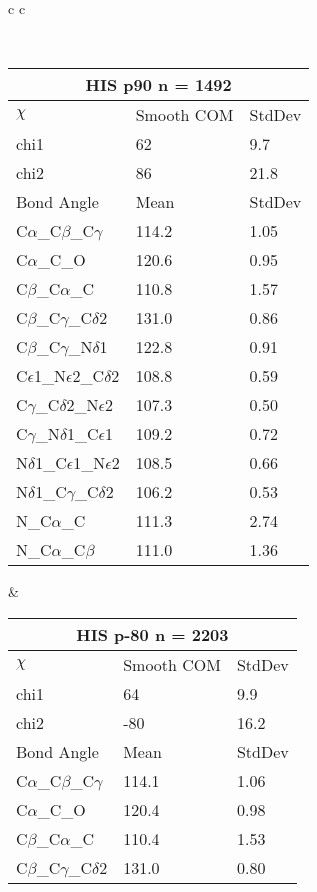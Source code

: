 \newpage

\begin{longtable}{ c c }

\caption{HIS Central Values}\\
  \begin{tabular}{ l l l }
  \toprule
  \multicolumn{3}{c}{HIS \textbf{p90} n = 1492} \\ \toprule
  $\chi$       & Smooth COM & StdDev \\ \midrule
  chi1 & 62 & 9.7 \\ 
  chi2 & 86 & 21.8 \\ \midrule
  Bond Angle   & Mean     & StdDev \\ \midrule
  C$\alpha$\_C$\beta$\_C$\gamma$ & 114.2 & 1.05\\
  C$\alpha$\_C\_O & 120.6 & 0.95\\
  C$\beta$\_C$\alpha$\_C & 110.8 & 1.57\\
  C$\beta$\_C$\gamma$\_C$\delta$2 & 131.0 & 0.86\\
  C$\beta$\_C$\gamma$\_N$\delta$1 & 122.8 & 0.91\\
  C$\epsilon$1\_N$\epsilon$2\_C$\delta$2 & 108.8 & 0.59\\
  C$\gamma$\_C$\delta$2\_N$\epsilon$2 & 107.3 & 0.50\\
  C$\gamma$\_N$\delta$1\_C$\epsilon$1 & 109.2 & 0.72\\
  N$\delta$1\_C$\epsilon$1\_N$\epsilon$2 & 108.5 & 0.66\\
  N$\delta$1\_C$\gamma$\_C$\delta$2 & 106.2 & 0.53\\
  N\_C$\alpha$\_C & 111.3 & 2.74\\
  N\_C$\alpha$\_C$\beta$ & 111.0 & 1.36\\
  \bottomrule
  \end{tabular}
  &
  \begin{tabular}{ l l l }
  \toprule
  \multicolumn{3}{c}{HIS \textbf{p-80} n = 2203} \\ \toprule
  $\chi$       & Smooth COM & StdDev \\ \midrule
  chi1 & 64 & 9.9 \\ 
  chi2 & -80 & 16.2 \\ \midrule
  Bond Angle   & Mean     & StdDev \\ \midrule
  C$\alpha$\_C$\beta$\_C$\gamma$ & 114.1 & 1.06\\
  C$\alpha$\_C\_O & 120.4 & 0.98\\
  C$\beta$\_C$\alpha$\_C & 110.4 & 1.53\\
  C$\beta$\_C$\gamma$\_C$\delta$2 & 131.0 & 0.80\\

\end{tabular}
\end{longtable}
